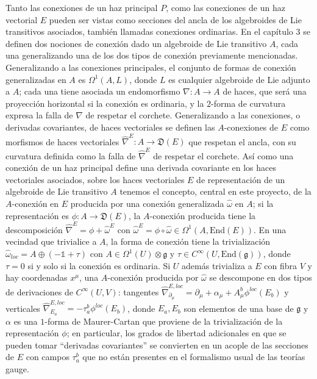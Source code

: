 \documentclass{article}
\begin{document}
Tanto las conexiones de un haz principal $P$, como las conexiones de un haz vectorial $E$ pueden ser vistas como secciones del ancla de los algebroides de Lie transitivos asociados, también llamadas conexiones ordinarias. En el capítulo $3$ se definen dos nociones de conexión dado un algebroide de Lie transitivo $A$, cada una generalizando una de los dos tipos de conexión previamente mencionadas. Generalizando a las conexiones principales, el conjunto de formas de conexión generalizadas en $A$ es $\Omega^1(A, L)$, donde $L$ es cualquier algebroide de Lie adjunto a $A$; cada una tiene asociada un endomorfismo $\nabla: A \to A$ de haces, que será una proyección horizontal si la conexión es ordinaria, y la $2$-forma de curvatura expresa la falla de $\nabla$ de respetar el corchete. Generalizando a las conexiones, o derivadas covariantes, de haces vectoriales se definen las $A$-conexiones de $E$ como morfismos de haces vectoriales $\hat \nabla^E: A \to \mathfrak D(E)$ que respetan el ancla, con su curvatura definida como la falla de $\hat \nabla^E$ de respetar el corchete. Así como una conexión de un haz principal define una derivada covariante en los haces vectoriales asociados, sobre los haces vectoriales $E$ de representación de un algebroide de Lie transitivo $A$ tenemos el concepto, central en este proyecto, de la $A$-conexión en $E$ producida por una conexión generalizada $\hat \omega$ en $A$; si la representación es $\phi: A \to \mathfrak D(E)$, la $A$-conexión producida tiene la descomposición $\hat \nabla^E = \phi + \hat \omega^E$ con $\hat \omega^E = \phi \circ \hat \omega \in \Omega^1(A, \text{End}(E))$. En una vecindad que trivialice a $A$, la forma de conexión tiene la trivialización $\hat \omega_{loc} = A \oplus (-\mathbb 1 + \tau)$ con $A \in \Omega^1(U)\otimes \mathfrak g$ y $\tau \in C^\infty(U, \text{End}(\mathfrak g))$, donde $\tau = 0$ si y solo si la conexión es ordinaria. Si $U$ además trivializa a $E$ con fibra $V$ y hay coordenadas ${x^\mu}$, una $A$-conexión producida por $\hat \omega$ se descompone en dos tipos de derivaciones de $C^\infty(U, V)$: tangentes $\hat \nabla^{E, loc}_{\partial_\mu} = \partial_\mu + \alpha_\mu + A^b_\mu \phi^{loc}(E_b)$ y verticales $\hat \nabla^{E, loc}_{E_a} = - \tau^b_a \phi^{loc} (E_b)$, donde $E_a, E_b$ son elementos de una base de $\mathfrak g$ y $\alpha$ es una $1$-forma de Maurer-Cartan que proviene de la trivialización de la representación $\phi$; en particular, los grados de libertad adicionales en que se pueden tomar ``derivadas covariantes'' se convierten en un acople de las secciones de $E$ con campos $\tau^b_a$ que no están presentes en el formalismo usual de las teorías gauge.
\end{document}
